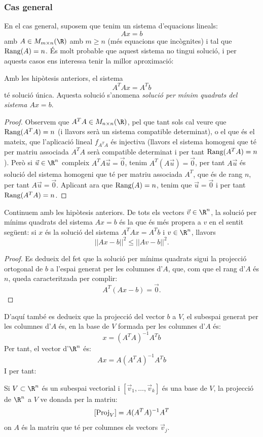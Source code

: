 \subsubsection{Cas general}
En el cas general, suposem que tenim un sistema d'equacions lineals:
\[
A x = b
\]
amb $A\in M_{m\times n}(\R)$ amb $m\geq n$ (més equacions que incògnites) i tal que $\operatorname{Rang}(A)=n$. És molt probable que aquest sistema no tingui solució, i per aquests casos ens interessa tenir la millor aproximació:
\begin{lema}
Amb les hipòtesis anteriors, el sistema
\[
A^T A x = A^T b
\]
té solució única. Aquesta solució s'anomena \emph{solució per mínim quadrats del sistema $Ax=b$}.
\end{lema}
\begin{proof}
Observem que $A^TA \in M_{n\times n}(\R)$, pel que tant sols cal veure que $\operatorname{Rang}(A^T A)=n$ (i llavors serà un sistema compatible determinat), o el que és el mateix, que l'aplicació lineal $f_{A^TA}$ és injectiva (llavors el sistema homogeni que té per matriu associada $A^TA$ serà compatible determinat i per tant $\operatorname{Rang}(A^T A)=n$). Però si $\vec u \in \R^n$ compleix $A^TA\vec u=\vec 0$, tenim $A^T(A\vec u)=\vec 0$, per tant $A\vec u$ és solució del sistema homogeni que té per matriu associada $A^T$, que és de rang $n$, per tant $A\vec u=\vec 0$. Aplicant ara que $\operatorname{Rang}(A)=n$, tenim que $\vec u=\vec 0$ i per tant $\operatorname{Rang}(A^TA)=n$.
\end{proof}
\begin{lema}
Continuem amb les hipòtesis anteriors.
De tots els vectors $\vec v \in \R^n$, la solució per mínims quadrats del sistema $Ax=b$ és la que és més propera a $v$ en el sentit següent: si $x$ és la solució del sistema $A^TAx=A^Tb$ i $v\in \R^n$, llavors 
\[
||Ax - b||^2 \leq ||Av- b||^2.
\]
\end{lema}
\begin{proof}
Es dedueix del fet que la solució per mínims quadrats sigui la projecció ortogonal de $b$ a l'espai generat per les columnes d'$A$, que, com que el rang d'$A$ és $n$, queda caracteritzada per complir:
\[
A^T(Ax-b)=\vec 0 .
\]
\end{proof}
D'aquí també es dedueix que la projecció del vector $b$ a $V$, el subespai generat per les columnes d'$A$ és, en la base de $V$ formada per les columnes d'$A$ és:
\[
x=(A^TA)^{-1}A^Tb
\]
Per tant, el vector d'$\R^n$ és:
\[
Ax=A(A^TA)^{-1}A^Tb
\]
I per tant:
\begin{proposicio}
Si $V\subset \R^n$ és un subespai vectorial i $[\vec v_1, \dots , \vec v_k]$ és una base de $V$, la projecció de $\R^n$ a $V$ ve donada per la matriu:
\[
[\operatorname{Proj}_V]=A(A^TA)^{-1}A^T
\]
on $A$ és la matriu que té per columnes els vectors $\vec v_j$.
\end{proposicio}
